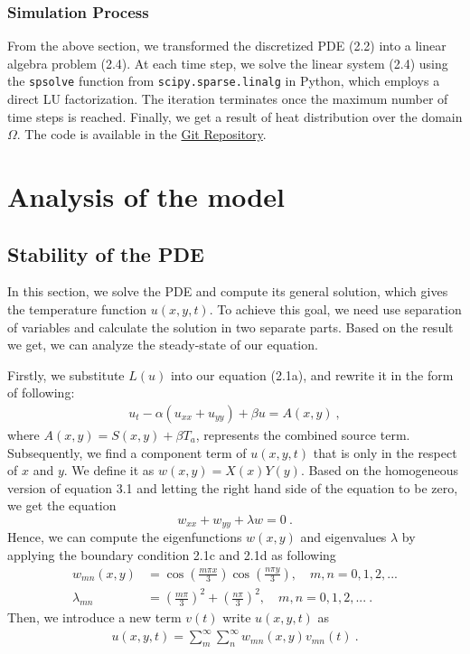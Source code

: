 \documentclass{article}
\begin{document}
\subsubsection*{Simulation Process}
\noindent From the above section, we transformed the discretized PDE (2.2) into a linear algebra problem (2.4). At each time step, we solve the linear system (2.4) using the \texttt{spsolve} function from \texttt{scipy.sparse.linalg} in Python, which employs a direct LU factorization. The iteration terminates once the maximum number of time steps is reached. Finally, we get a result of heat distribution over the domain $\Omega$. The code is available in the \href{https://github.com/tusm06/MATH461_Unit03}{Git Repository}.


\section{Analysis of the model}

\subsection{Stability of the PDE}

In this section, we solve the PDE and compute its general solution, which gives the temperature function $u(x,y,t)$. To achieve this goal, we need use separation of variables and calculate the solution in two separate parts. Based on the result we get, we can analyze the steady-state of our equation.

\vspace{3mm}

\noindent Firstly, we substitute $L(u)$ into our equation (2.1a), and rewrite it in the form of following:
\begin{align*}
    u_t - \alpha(u_{xx} + u_{yy}) + \beta u = A (x, y) \ , \tag{3.1}
\end{align*}
where $A(x,y) = S(x, y) + \beta T_a$, represents the combined source term. Subsequently, we find a component term of $u (x,y,t)$ that is only in the respect of $x$ and $y$. We define it as $w(x,y) = X(x)Y(y)$. Based on the homogeneous version of equation 3.1 and letting the right hand side of the equation to be zero, we get the equation
$$
w_{xx} + w_{yy} + \lambda w = 0 \ .
$$
Hence, we can compute the eigenfunctions $w(x,y)$ and eigenvalues $\lambda$ by applying the boundary condition 2.1c and 2.1d as following
\begin{align*}
    w_{mn}(x,y) &= \cos\left(\frac{m\pi x}{3}\right)\cos\left(\frac{n\pi y}{3}\right), \quad m,n = 0,1,2,... \\
    \lambda_{mn} &= \left(\frac{m\pi}{3}\right)^2 + \left(\frac{n\pi}{3}\right)^2, \quad m,n = 0,1,2,... \ .
\end{align*}
Then, we introduce a new term $v(t)$ write $u(x,y,t)$ as
\begin{align*}
    u(x,y,t) = \sum_{m}^\infty \sum_{n}^\infty w_{mn}(x,y)v_{mn}(t) \ . \tag{3.2}
\end{align*}
\end{document}
